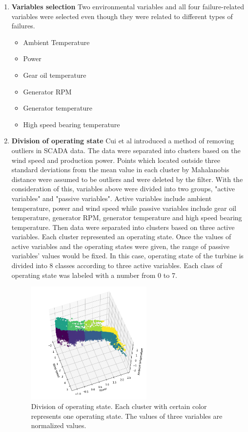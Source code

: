 \begin{enumerate}
\item \textbf{Variables selection}
Two environmental variables and all four failure-related variables were selected even though they were related to different types of failures.

\begin{itemize}
\item Ambient Temperature
\item Power
\item Gear oil temperature
\item Generator RPM
\item Generator temperature
\item High speed bearing temperature
\end{itemize}

\item \textbf{Division of operating state}
Cui et al \cite{cui2018anomaly} introduced a method of removing outliers in SCADA data. The data were separated into clusters based on the wind speed and production power. Points which located outside three standard deviations from the mean value in each cluster by Mahalanobis distance were assumed to be outliers and were deleted by the filter. With the consideration of this, variables above were divided into two groups, "active variables" and "passive variables". Active variables include ambient temperature, power and wind speed while passive variables include gear oil temperature, generator RPM, generator temperature and high speed bearing temperature. Then data were separated into clusters based on three active variables. Each cluster represented an operating state. Once the values of active variables and the operating states were given, the range of passive variables' values would be fixed. In this case, operating state of the turbine is divided into 8 classes according to three active variables. Each class of operating state was labeled with a number from 0 to 7.

\begin{figure}[]
\centering
\includegraphics[width=0.59\textwidth]{figures/operating_state_division3d.png}
\caption{Division of operating state. Each cluster with certain color represents one operating state. The values of three variables are normalized values.}
\label{fig:B-B1}
\end{figure}


\end{enumerate}

